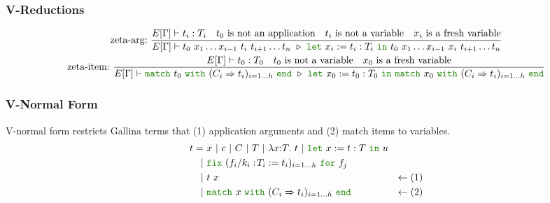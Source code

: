 \documentclass[a4paper,fleqn]{article}
\def\gallina{\textrm{Gallina}}
\newcommand{\kwlet}{\mbox{\color{mygreen}\ttfamily let}}
\newcommand{\kwin}{\mbox{\color{mygreen}\ttfamily in}}
\newcommand{\kwmatch}{\mbox{\color{mygreen}\ttfamily match}}
\newcommand{\kwwith}{\mbox{\color{mygreen}\ttfamily with}}
\newcommand{\kwend}{\mbox{\color{mygreen}\ttfamily end}}
\newcommand{\kwfix}{\mbox{\color{mygreen}\ttfamily fix}}
\newcommand{\kwfor}{\mbox{\color{mygreen}\ttfamily for}}
\newcommand{\lamT}[3]{\lambda #1\mathord{:}#2.~#3}
\newcommand{\letin}[3]{\kwlet~#1:=#2~\kwin~#3}
\newcommand{\match}[4]{\kwmatch~#1~\kwwith~(#2 \Rightarrow #3)_{#4}~\kwend}
\newcommand{\fixT}[5]{\kwfix~(#1:\!#2 := #3)_{#4}~\kwfor~#5}
\begin{document}
\subsubsection{V-Reductions}\label{sec:v-reductions}
\begin{gather*}
  \text{zeta-arg:}~
    \dfrac
    {
      E[\Gamma] \vdash t_i : T_i \quad
      \text{$t_0$ is not an application} \quad
      \text{$t_i$ is not a variable} \quad
      \text{$x_i$ is a fresh variable}
    }{
      E[\Gamma] \vdash
      t_0~x_1 \ldots x_{i-1}~t_i~t_{i+1} \ldots t_n
      ~\triangleright~
      \letin{x_i}{t_i:T_i}{t_0~x_1 \ldots x_{i-1}~x_i~t_{i+1} \ldots t_n}
    } \\
  \text{zeta-item:}~
    \dfrac
    {
      E[\Gamma] \vdash t_0 : T_0 \quad
      \text{$t_0$ is not a variable} \quad
      \text{$x_0$ is a fresh variable}
    }{
      E[\Gamma] \vdash
      \match{t_0}{C_i}{t_i}{i=1\dots h}
      ~\triangleright~
      \letin{x_0}{t_0:T_0}{\match{x_0}{C_i}{t_i}{i=1\dots h}}
    }
\end{gather*}

\subsubsection{V-Normal Form}\label{sec:v-normal-form}
V-normal form restricts \gallina{} terms that (1) application arguments and (2) match items to variables.
\begin{align*}
  t =&\ x~|~c~|~C~|~T~|~\lamT{x}{T}{t}~|~ \letin{x}{t:T}{u} \\
    |&\ \fixT{f_i/k_i}{T_i}{t_i}{i=1\dots h}{f_j} \\
    |&\ t~x                               & \leftarrow (1) \\
    |&\ \match{x}{C_i}{t_i}{i=1\dots h} & \leftarrow (2)
\end{align*}
\end{document}
